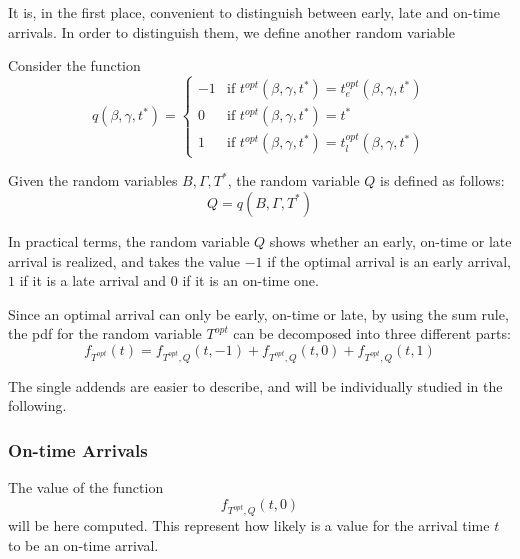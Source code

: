 It is, in the first place,
convenient to distinguish between early, late and on-time arrivals.
In order to distinguish them, we define another random variable
\begin{definition}
  Consider the function
  \begin{equation*}
    q(\beta, \gamma, t^*) =
    \begin{cases}
      -1 & \text{if } t^{opt}(\beta, \gamma, t^*) = t_e^{opt}(\beta, \gamma, t^*) \\
      0 & \text{if } t^{opt}(\beta, \gamma, t^*) = t^* \\
      1 & \text{if } t^{opt}(\beta, \gamma, t^*) = t_l^{opt}(\beta, \gamma, t^*)
    \end{cases}
  \end{equation*}

  Given the random variables \(B, \Gamma, T^*\), the random variable \(Q\) is defined as follows:
  \begin{equation*}
    Q  = q(B, \Gamma, T^*)
  \end{equation*}
\end{definition}

In practical terms, the random variable \(Q\) shows whether an early, on-time or late arrival is realized,
and takes the value \(-1\) if the optimal arrival is an early arrival,
\(1\) if it is a late arrival and \(0\) if it is an on-time one.

Since an optimal arrival can only be early, on-time or late,
by using the sum rule, the pdf for the random variable \(T^{opt}\) can be decomposed into three different parts:
\begin{equation}
  \label{eq:pdf-decomposed-q}
  f_{T^{opt}}(t) = f_{T^{opt}, Q}(t, -1) + f_{T^{opt}, Q}(t, 0) + f_{T^{opt}, Q}(t, 1)
\end{equation}

The single addends are easier to describe,
and will be individually studied in the following.

\subsubsection{On-time Arrivals}

The value of the function
\begin{equation*}
  f_{T^{opt}, Q}(t, 0)
\end{equation*}
will be here computed.
This represent how likely is a value for the arrival time \(t\) to be an on-time arrival.

